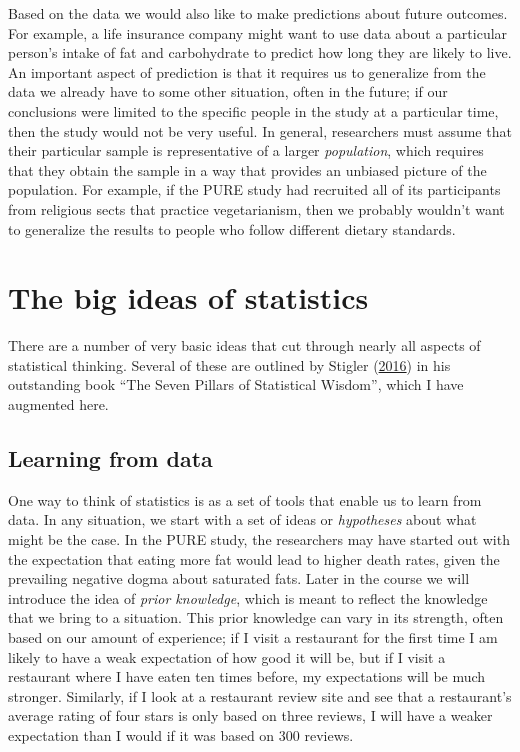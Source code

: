 \documentclass[12pt,]{book}
\theoremstyle{definition}
\theoremstyle{definition}
\theoremstyle{definition}
\theoremstyle{remark}
\begin{document}
Based on the data we would also like to make predictions about future outcomes. For example, a life insurance company might want to use data about a particular person's intake of fat and carbohydrate to predict how long they are likely to live. An important aspect of prediction is that it requires us to generalize from the data we already have to some other situation, often in the future; if our conclusions were limited to the specific people in the study at a particular time, then the study would not be very useful. In general, researchers must assume that their particular sample is representative of a larger \emph{population}, which requires that they obtain the sample in a way that provides an unbiased picture of the population. For example, if the PURE study had recruited all of its participants from religious sects that practice vegetarianism, then we probably wouldn't want to generalize the results to people who follow different dietary standards.

\hypertarget{the-big-ideas-of-statistics}{%
\section{The big ideas of statistics}\label{the-big-ideas-of-statistics}}

There are a number of very basic ideas that cut through nearly all aspects of statistical thinking. Several of these are outlined by Stigler (\protect\hyperlink{ref-stig}{2016}) in his outstanding book ``The Seven Pillars of Statistical Wisdom'', which I have augmented here.

\hypertarget{learning-from-data}{%
\subsection{Learning from data}\label{learning-from-data}}

One way to think of statistics is as a set of tools that enable us to learn from data. In any situation, we start with a set of ideas or \emph{hypotheses} about what might be the case. In the PURE study, the researchers may have started out with the expectation that eating more fat would lead to higher death rates, given the prevailing negative dogma about saturated fats. Later in the course we will introduce the idea of \emph{prior knowledge}, which is meant to reflect the knowledge that we bring to a situation. This prior knowledge can vary in its strength, often based on our amount of experience; if I visit a restaurant for the first time I am likely to have a weak expectation of how good it will be, but if I visit a restaurant where I have eaten ten times before, my expectations will be much stronger. Similarly, if I look at a restaurant review site and see that a restaurant's average rating of four stars is only based on three reviews, I will have a weaker expectation than I would if it was based on 300 reviews.
\end{document}
